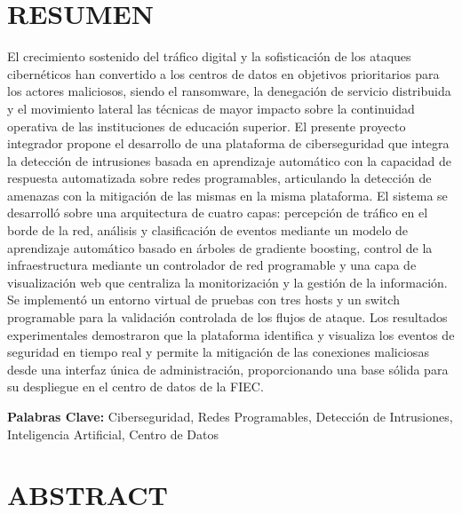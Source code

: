 \chapter{RESUMEN}

El crecimiento sostenido del tr\'afico digital y la sofisticaci\'on de los ataques cibern\'eticos han convertido a los centros de datos en objetivos prioritarios para los actores maliciosos, siendo el ransomware, la denegaci\'on de servicio distribuida y el movimiento lateral las t\'ecnicas de mayor impacto sobre la continuidad operativa de las instituciones de educaci\'on superior. El presente proyecto integrador propone el desarrollo de una plataforma de ciberseguridad que integra la detecci\'on de intrusiones basada en aprendizaje autom\'atico con la capacidad de respuesta automatizada sobre redes programables, articulando la detecci\'on de amenazas con la mitigaci\'on de las mismas en la misma plataforma. El sistema se desarroll\'o sobre una arquitectura de cuatro capas: percepci\'on de tr\'afico en el borde de la red, an\'alisis y clasificaci\'on de eventos mediante un modelo de aprendizaje autom\'atico basado en \'arboles de gradiente boosting, control de la infraestructura mediante un controlador de red programable y una capa de visualizaci\'on web que centraliza la monitorizaci\'on y la gesti\'on de la informaci\'on. Se implement\'o un entorno virtual de pruebas con tres hosts y un switch programable para la validaci\'on controlada de los flujos de ataque. Los resultados experimentales demostraron que la plataforma identifica y visualiza los eventos de seguridad en tiempo real y permite la mitigaci\'on de las conexiones maliciosas desde una interfaz \'unica de administraci\'on, proporcionando una base s\'olida para su despliegue en el centro de datos de la FIEC.

\textbf{Palabras Clave:} Ciberseguridad, Redes Programables, Detecci\'on de Intrusiones, Inteligencia Artificial, Centro de Datos


\chapter{ABSTRACT}

